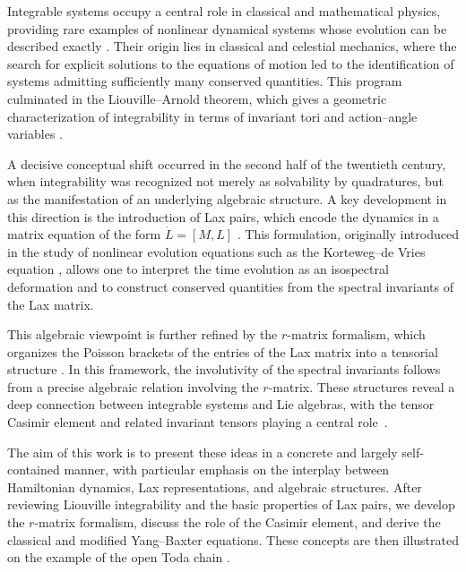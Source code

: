 Integrable systems occupy a central role in classical and mathematical physics, providing rare examples of nonlinear dynamical systems whose evolution can be described exactly \cite{babelon2003introduction,perelomov1990integrable}. Their origin lies in classical and celestial mechanics, where the search for explicit solutions to the equations of motion led to the identification of systems admitting sufficiently many conserved quantities. This program culminated in the Liouville–Arnold theorem, which gives a geometric characterization of integrability in terms of invariant tori and action–angle variables \cite{babelon2003introduction}.

A decisive conceptual shift occurred in the second half of the twentieth century, when integrability was recognized not merely as solvability by quadratures, but as the manifestation of an underlying algebraic structure. A key development in this direction is the introduction of Lax pairs, which encode the dynamics in a matrix equation of the form $\dot{L} = [M,L]$ \cite{https://doi.org/10.1002/cpa.3160210503}. This formulation, originally introduced in the study of nonlinear evolution equations such as the Korteweg–de Vries equation \cite{gardner1967method,Zakharov1971}, allows one to interpret the time evolution as an isospectral deformation and to construct conserved quantities from the spectral invariants of the Lax matrix.

This algebraic viewpoint is further refined by the $r$-matrix formalism, which organizes the Poisson brackets of the entries of the Lax matrix into a tensorial structure \cite{SemenovTyanShanskii1983,Sklyanin1982}. In this framework, the involutivity of the spectral invariants follows from a precise algebraic relation involving the $r$-matrix. These structures reveal a deep connection between integrable systems and Lie algebras, with the tensor Casimir element and related invariant tensors playing a central role~\cite{perelomov1990integrable}.

The aim of this work is to present these ideas in a concrete and largely self-contained manner, with particular emphasis on the interplay between Hamiltonian dynamics, Lax representations, and algebraic structures. After reviewing Liouville integrability and the basic properties of Lax pairs, we develop the $r$-matrix formalism, discuss the role of the Casimir element, and derive the classical and modified Yang–Baxter equations. These concepts are then illustrated on the example of the open Toda chain \cite{toda1967vibration,Olshanetsky1979,KOSTANT1979195}.

